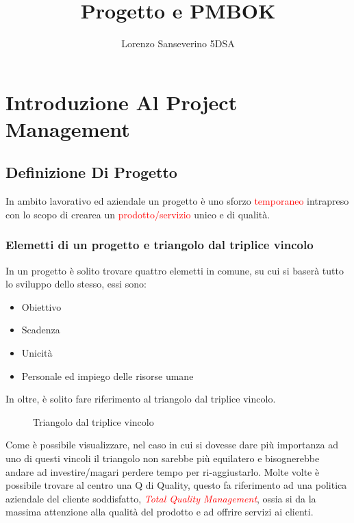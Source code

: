 \documentclass{report}
\title{Progetto e PMBOK}
\author{Lorenzo Sanseverino 5DSA}
\begin{document}
\tableofcontents
\maketitle




\chapter{Introduzione Al Project Management}
\section{Definizione Di Progetto}

In ambito lavorativo ed aziendale un progetto è uno sforzo \textcolor{red}{temporaneo} intrapreso con lo scopo di crearea un \textcolor{red}{prodotto/servizio} unico e di qualità. 

\subsection{Elemetti di un progetto e triangolo dal triplice vincolo}
In un progetto è solito trovare quattro elemetti in comune, su cui si baserà tutto lo sviluppo dello stesso, essi sono:

\begin{itemize}
\item Obiettivo
\item Scadenza
\item Unicità
\item Personale ed impiego delle risorse umane
\end{itemize}

In oltre, è solito fare riferimento al triangolo dal triplice vincolo.
\begin{figure}[h]
\caption{Triangolo dal triplice vincolo}
\label{t}
\end{figure}
Come è possibile visualizzare, nel caso in cui si dovesse dare più importanza ad uno di questi vincoli il triangolo non sarebbe più equilatero e bisognerebbe andare ad investire/magari perdere tempo per ri-aggiustarlo.
Molte volte è possibile trovare al centro una Q di Quality, questo fa riferimento ad una politica aziendale del cliente soddisfatto, \textit{\textcolor{red}{Total Quality Management}}, ossia si da la massima attenzione alla qualità del prodotto e ad offrire servizi ai clienti.
\end{document}
